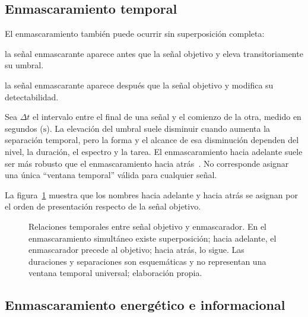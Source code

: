 \subsection{Enmascaramiento temporal}
\label{sec:u7-enmascaramiento-temporal}

El enmascaramiento también puede ocurrir sin superposición completa:

\begin{description}[style=nextline]
    \item[\textbf{Enmascaramiento hacia adelante:}]
    la señal enmascarante aparece antes que la señal objetivo y eleva
    transitoriamente su umbral.

    \item[\textbf{Enmascaramiento hacia atrás:}]
    la señal enmascarante aparece después que la señal objetivo y modifica su
    detectabilidad.
\end{description}

Sea \(\Delta t\) el intervalo entre el final de una señal y el comienzo de la
otra, medido en segundos (\(\text{s}\)). La elevación del umbral suele
disminuir cuando aumenta la separación temporal, pero la forma y el alcance de
esa disminución dependen del nivel, la duración, el espectro y la tarea. El
enmascaramiento hacia adelante suele ser más robusto que el enmascaramiento
hacia atrás~\cite{moore2008,bronkhorst2000}. No corresponde asignar una única ``ventana temporal'' válida
para cualquier señal.

La figura~\ref{fig:u7-enmascaramiento-temporal} muestra que los nombres hacia
adelante y hacia atrás se asignan por el orden de presentación respecto de la
señal objetivo.

\begin{figure}[htbp]
    \centering
    
    \caption{Relaciones temporales entre señal objetivo y enmascarador. En el
    enmascaramiento simultáneo existe superposición; hacia adelante, el
    enmascarador precede al objetivo; hacia atrás, lo sigue. Las duraciones y
    separaciones son esquemáticas y no representan una ventana temporal
    universal; elaboración propia.}
    \label{fig:u7-enmascaramiento-temporal}
\end{figure}

\subsection{Enmascaramiento energético e informacional}
\label{sec:u7-enmascaramiento-energetico-informacional}

